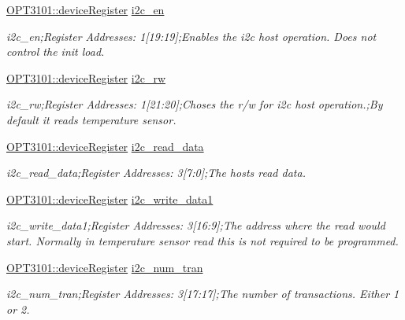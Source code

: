 \begin{DoxyCompactItemize}
\mbox{\hyperlink{class_o_p_t3101_1_1device_register}{O\+P\+T3101\+::device\+Register}} \mbox{\hyperlink{class_o_p_t3101_1_1registers_a0bf477ba963f16f5ff32c9f3e33b279a}{i2c\+\_\+en}}
\begin{DoxyCompactList}\small\item\em i2c\+\_\+en;Register Addresses\+: 1\mbox{[}19\+:19\mbox{]};Enables the i2c host operation. Does not control the init load. \end{DoxyCompactList}\item 
\mbox{\hyperlink{class_o_p_t3101_1_1device_register}{O\+P\+T3101\+::device\+Register}} \mbox{\hyperlink{class_o_p_t3101_1_1registers_aa7c611361794c31bdd274f9817401258}{i2c\+\_\+rw}}
\begin{DoxyCompactList}\small\item\em i2c\+\_\+rw;Register Addresses\+: 1\mbox{[}21\+:20\mbox{]};Choses the r/w for i2c host operation.;By default it reads temperature sensor. \end{DoxyCompactList}\item 
\mbox{\hyperlink{class_o_p_t3101_1_1device_register}{O\+P\+T3101\+::device\+Register}} \mbox{\hyperlink{class_o_p_t3101_1_1registers_af7380f75d50a537df750a8039b4ecb53}{i2c\+\_\+read\+\_\+data}}
\begin{DoxyCompactList}\small\item\em i2c\+\_\+read\+\_\+data;Register Addresses\+: 3\mbox{[}7\+:0\mbox{]};The hosts read data. \end{DoxyCompactList}\item 
\mbox{\hyperlink{class_o_p_t3101_1_1device_register}{O\+P\+T3101\+::device\+Register}} \mbox{\hyperlink{class_o_p_t3101_1_1registers_adf24c56655b70ac41364ab30f75dc61c}{i2c\+\_\+write\+\_\+data1}}
\begin{DoxyCompactList}\small\item\em i2c\+\_\+write\+\_\+data1;Register Addresses\+: 3\mbox{[}16\+:9\mbox{]};The address where the read would start. Normally in temperature sensor read this is not required to be programmed. \end{DoxyCompactList}\item 
\mbox{\hyperlink{class_o_p_t3101_1_1device_register}{O\+P\+T3101\+::device\+Register}} \mbox{\hyperlink{class_o_p_t3101_1_1registers_a0c38b1f0e52b91fda5deaa74d588d4ee}{i2c\+\_\+num\+\_\+tran}}
\begin{DoxyCompactList}\small\item\em i2c\+\_\+num\+\_\+tran;Register Addresses\+: 3\mbox{[}17\+:17\mbox{]};The number of transactions. Either 1 or 2. \end{DoxyCompactList}\item 

\end{DoxyCompactItemize}
